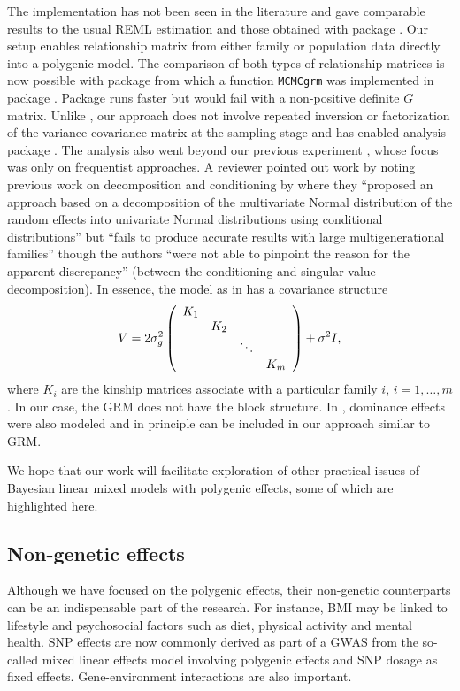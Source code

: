 \documentclass[article]{jss}
\begin{document}
The implementation has not been seen in the literature and
 gave comparable results to the usual REML estimation
and those obtained with package . Our setup enables relationship
matrix from either family or population data directly into a polygenic
model. The comparison of both types of relationship matrices is now
possible with package  from which a function \verb/MCMCgrm/ was
implemented in package . Package  runs faster but would fail with a
non-positive definite $G$ matrix. Unlike \cite{guo91}, our approach
does not involve repeated inversion or factorization of the
variance-covariance matrix at the sampling stage and has enabled
analysis package . The analysis also went
beyond our previous experiment \citep{zhao12}, whose focus was only on
frequentist approaches. A reviewer pointed out work by \cite{bae14}
noting previous work on decomposition and conditioning by
\citet{waldman08, hallander10} where they ``proposed an approach based
on a decomposition of the multivariate Normal distribution of the
random effects into univariate Normal distributions using conditional
distributions'' but ``fails to produce accurate results with large
multigenerational families'' though the authors ``were not able to
pinpoint the reason for the apparent discrepancy'' (between the
conditioning and singular value decomposition). In essence, the model
as in \cite{bae14} has a covariance structure
\begin{equation}
V = 2\sigma_g^2\left( \begin{array}{cccc}
K_1 & \hfill & \hfill & \hfill \\
\hfill & K_2 & \hfill & \hfill \\
\hfill & \hfill & \ddots \hfill \\
\hfill & \hfill & \hfill & K_m \\
\end{array} \right)+\sigma^2I,
\end{equation}
where $K_i$ are the kinship matrices associate with a particular family $i$,
$i=1, \ldots, m$. In our case, the GRM does not have the block structure. In
\cite{hallander10}, dominance effects were also modeled and in principle
can be included in our approach similar to GRM.

We hope that our work will facilitate exploration of other practical issues
of Bayesian linear mixed models with polygenic effects, some of which are
highlighted here. 

\subsection{Non-genetic effects}
Although we have focused on the polygenic effects, their non-genetic 
counterparts can be an indispensable part of the research. For instance, BMI may
be linked to lifestyle and psychosocial factors such as diet, physical 
activity and mental health. SNP effects are now commonly derived as part
of a GWAS from the so-called mixed linear effects model involving polygenic
effects and SNP dosage as fixed effects. Gene-environment interactions
are also important. 
\end{document}
